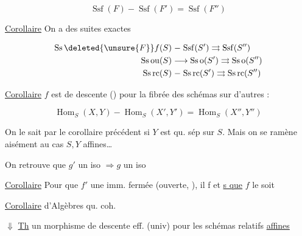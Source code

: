 \[
\operatorname{Ssf}(F)\mathrel{-}\operatorname{Ssf}(F')=\operatorname{Ssf}(F'')
\]

\uline{Corollaire} On a des suites exactes


\[
\begin{aligned}
 \operatorname{Ss}\deleted{\unsure{F}}f(S)&\mathrel{-}\operatorname{Ssf}(S')\rightrightarrows\operatorname{Ssf}(S'')\\
 \operatorname{Ss\,ou}(S)&\longrightarrow\operatorname{Ss\,o}(S')\rightrightarrows\operatorname{Ss\,o}(S'')\\
 \operatorname{Ss\,rc}(S)&\mathrel{-}\operatorname{Ss\,rc}(S')\rightrightarrows\operatorname{Ss\,rc}(S'')
\end{aligned}
\]


\uline{Corollaire} $f$ est de descente () pour la  fibrée des schémas sur d'autres :

\[
 \operatorname{Hom}_S(X,Y)\mathrel{-}\operatorname{Hom}_S(X',Y')=\operatorname{Hom}_S(X'',Y'')
\]


On le sait par le corollaire précédent si $Y$ est qu. sép sur $S$. Mais on se ramène aisément au cas $S,Y$ affines\ldots

On retrouve que $g'$ un iso $\Rightarrow g$ un iso

\uline{Corollaire} Pour que $f'$ une imm. fermée (ouverte,  ), il f et \uline{s que} $f$ le soit


\uline{Corollaire}  d'Algèbres qu. coh.

$\Downarrow$  \uline{Th}   un morphisme de descente eff. (univ) pour les schémas relatifs \uline{affines}

